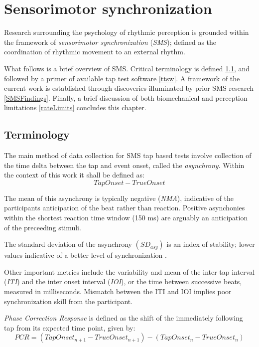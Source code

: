 \section{Sensorimotor synchronization}
Research surrounding the psychology of rhythmic perception is grounded within the framework of \textit{sensorimotor synchronization} (\textit{SMS}); defined as the coordination of rhythmic movement to an external rhythm. 

What follows is a brief overview of SMS. Critical terminology is defined \ref{SMSTerms}, and followed by a primer of available tap test software \ref{ttsw}. A framework of the current work is established through discoveries illuminated by prior SMS research \ref{SMSFindings}. Finally, a brief discussion of both biomechanical and perception limitations \ref{rateLimits} concludes this chapter.

\subsection{Terminology} \label{SMSTerms}
The main method of data collection for SMS tap based tests involve collection of the time delta between the tap and event onset, called the \textit{asynchrony}. Within the context of this work it shall be defined as:
\begin{equation*}Tap Onset-True Onset\end{equation*} 

The mean of this asynchrony is typically negative (\textit{NMA}), indicative of the participants anticipation of the beat rather than reaction. Positive asynchonies within the shortest reaction time window (150 ms) are arguably an anticipation of the preceeding stimuli. 

The standard deviation of the asynchrony $(SD_{asy})$ is an index of stability; lower values indicative of a better level of synchronization \cite{repp2013sensorimotor}.

Other important metrics include the variability and mean of the inter tap interval (\textit{ITI}) and the inter onset interval (\textit{IOI}), or the time between successive beats, measured in milliseconds. Mismatch between the ITI and IOI implies poor synchronization skill from the participant. 

\textit{Phase Correction Response} is defined as the shift of the immediately following tap from its expected time point, given by:
\begin{equation*}
    PCR = (Tap Onset_{n+1} - True Onset_{n+1})-(Tap Onset_{n} - True Onset_{n})
\end{equation*}

